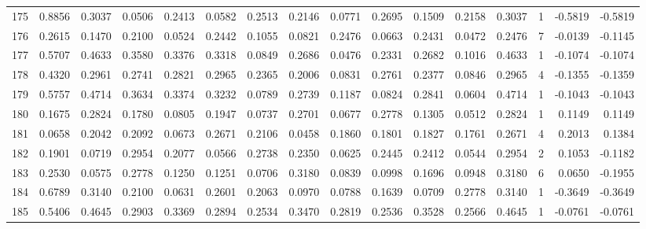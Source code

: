 \begin{tabular}{lrrrrrrrrrrrrrrr}
175 &      0.8856 &  0.3037 &  0.0506 &  0.2413 &  0.0582 &  0.2513 &  0.2146 &  0.0771 &  0.2695 &  0.1509 &   0.2158 &     0.3037 &      1 &                   -0.5819 &                    -0.5819 \\
176 &      0.2615 &  0.1470 &  0.2100 &  0.0524 &  0.2442 &  0.1055 &  0.0821 &  0.2476 &  0.0663 &  0.2431 &   0.0472 &     0.2476 &      7 &                   -0.0139 &                    -0.1145 \\
177 &      0.5707 &  0.4633 &  0.3580 &  0.3376 &  0.3318 &  0.0849 &  0.2686 &  0.0476 &  0.2331 &  0.2682 &   0.1016 &     0.4633 &      1 &                   -0.1074 &                    -0.1074 \\
178 &      0.4320 &  0.2961 &  0.2741 &  0.2821 &  0.2965 &  0.2365 &  0.2006 &  0.0831 &  0.2761 &  0.2377 &   0.0846 &     0.2965 &      4 &                   -0.1355 &                    -0.1359 \\
179 &      0.5757 &  0.4714 &  0.3634 &  0.3374 &  0.3232 &  0.0789 &  0.2739 &  0.1187 &  0.0824 &  0.2841 &   0.0604 &     0.4714 &      1 &                   -0.1043 &                    -0.1043 \\
180 &      0.1675 &  0.2824 &  0.1780 &  0.0805 &  0.1947 &  0.0737 &  0.2701 &  0.0677 &  0.2778 &  0.1305 &   0.0512 &     0.2824 &      1 &                    0.1149 &                     0.1149 \\
181 &      0.0658 &  0.2042 &  0.2092 &  0.0673 &  0.2671 &  0.2106 &  0.0458 &  0.1860 &  0.1801 &  0.1827 &   0.1761 &     0.2671 &      4 &                    0.2013 &                     0.1384 \\
182 &      0.1901 &  0.0719 &  0.2954 &  0.2077 &  0.0566 &  0.2738 &  0.2350 &  0.0625 &  0.2445 &  0.2412 &   0.0544 &     0.2954 &      2 &                    0.1053 &                    -0.1182 \\
183 &      0.2530 &  0.0575 &  0.2778 &  0.1250 &  0.1251 &  0.0706 &  0.3180 &  0.0839 &  0.0998 &  0.1696 &   0.0948 &     0.3180 &      6 &                    0.0650 &                    -0.1955 \\
184 &      0.6789 &  0.3140 &  0.2100 &  0.0631 &  0.2601 &  0.2063 &  0.0970 &  0.0788 &  0.1639 &  0.0709 &   0.2778 &     0.3140 &      1 &                   -0.3649 &                    -0.3649 \\
185 &      0.5406 &  0.4645 &  0.2903 &  0.3369 &  0.2894 &  0.2534 &  0.3470 &  0.2819 &  0.2536 &  0.3528 &   0.2566 &     0.4645 &      1 &                   -0.0761 &                    -0.0761 \\

\end{tabular}
